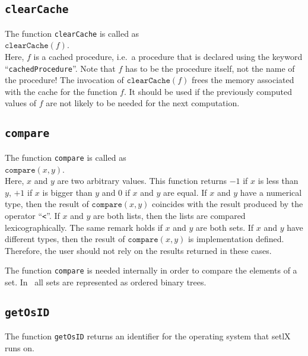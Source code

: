 \subsection{\texttt{clearCache}}
The function \texttt{clearCache}  is called as
\\[0.2cm]
\hspace*{1.3cm}
$\mathtt{clearCache}(f)$.
\\[0.2cm]
Here, $f$ is a cached procedure, i.e.~a procedure that is declared using the
keyword ``\texttt{cachedProcedure}''.  Note that $f$ has to be the procedure itself, not
the name of the procedure!  The invocation of $\texttt{clearCache}(f)$ frees the memory
associated with the cache for the function $f$.  It should be used if the previously
computed values of $f$ are not likely to be needed for the next computation.

\subsection{\texttt{compare}}
The function \texttt{compare}  is called as
\\[0.2cm]
\hspace*{1.3cm}
$\mathtt{compare}(x, y)$.
\\[0.2cm]
Here, $x$ and $y$ are two arbitrary values.  This function returns $-1$ if $x$ is less
than $y$, $+1$ if $x$ is bigger than $y$ and $0$ if $x$ and $y$ are equal.
If $x$ and $y$ have a numerical type,  then the result of $\mathtt{compare}(x,y)$
coincides with the result produced by the operator ``\texttt{<}''.
If $x$ and $y$ are both lists, then the lists are compared lexicographically.
The same remark holds if $x$ and $y$ are both sets.   If $x$ and $y$ have different types,
then the result of $\mathtt{compare}(x, y)$ is implementation defined.  Therefore, the
user should not rely on the results returned in these cases.

The function \texttt{compare} is needed internally in order to compare the elements of a
set.  In \setlx\ all sets are represented as ordered binary trees.

\subsection{\texttt{getOsID}}
The function \texttt{getOsID} returns an identifier for the operating system that setlX runs on.

